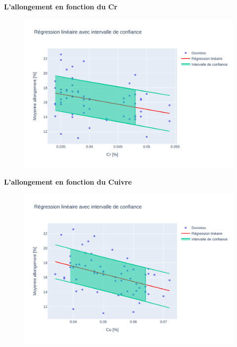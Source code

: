 \documentclass[12pt]{article}
\begin{document}
\textbf{L'allongement en fonction du  Cr} 
\begin{figure}[H]
\includegraphics[width=\textwidth]{Images/Statistique/Regression_Cr_Allongement.pdf} 
\end{figure}




\textbf{L'allongement en fonction du Cuivre} 
\begin{figure}[H]
\includegraphics[width=\textwidth]{Images/Statistique/Regression_Cu_Allongement.pdf} 
\end{figure}
\end{document}
